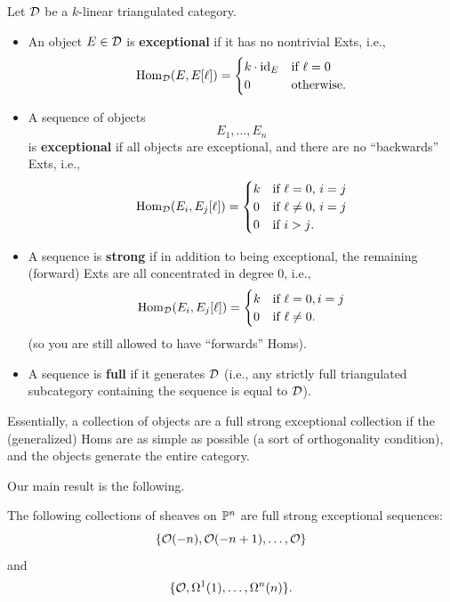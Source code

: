 \documentclass[12pt]{article}
\begin{document}
\begin{defn}
    Let $\cD$ be a $k$-linear triangulated category.
    \begin{itemize}
        \item An object $E\in \cD$ is \textbf{exceptional} if it has no nontrivial Exts, i.e.,
        \[\Hom_{\cD}(E,E[\ell]) = \begin{cases}
            k \cdot \id_E & \text{if $\ell=0$}\\
            0 & \text{otherwise.}
        \end{cases}\]
        \item A sequence of objects
        \[E_1,\dots,E_n\]
        is \textbf{exceptional} if all objects are exceptional, and there are no ``backwards'' Exts, i.e.,
        \[\Hom_\cD(E_i,E_j[\ell])=\begin{cases}
            k & \text{if $\ell=0$, $i=j$}\\
            0 & \text{if $\ell\neq 0$, $i=j$}\\
            0 & \text{if $i>j$.}
        \end{cases}\]
        \item A sequence is \textbf{strong} if in addition to being exceptional, the remaining (forward) Exts are all concentrated in degree 0, i.e.,
        \[\Hom_\cD(E_i,E_j[\ell]) = \begin{cases}
            k & \text{if $\ell=0,i=j$}\\
            0 & \text{if $\ell\neq 0$.}
        \end{cases}\]
        (so you are still allowed to have ``forwards'' Homs).
        \item A sequence is \textbf{full} if it generates $\cD$ (i.e., any strictly full triangulated subcategory containing the sequence is equal to $\cD$).
    \end{itemize}
\end{defn}

Essentially, a collection of objects are a full strong exceptional collection if the (generalized) Homs are as simple as possible (a sort of orthogonality condition), and the objects generate the entire category.

Our main result is the following.

\begin{thm}\label{beilinson-collection}
    The following collections of sheaves on $\P^n$ are full strong exceptional sequences:
    \[\{\cO(-n),\cO(-n+1),\dots,\cO\}\]
    and
    \[\{\cO,\Omega^1(1),\dots,\Omega^n(n)\}.\]
\end{thm}
\end{document}
